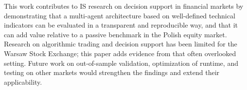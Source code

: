 \documentclass{icis}
\begin{document}
This work contributes to IS research on decision support in financial markets by demonstrating that a multi-agent architecture based on well-defined technical indicators can be evaluated in a transparent and reproducible way, and that it can add value relative to a passive benchmark in the Polish equity market. Research on algorithmic trading and decision support has been limited for the Warsaw Stock Exchange; this paper adds evidence from that often overlooked setting. Future work on out-of-sample validation, optimization of runtime, and testing on other markets would strengthen the findings and extend their applicability.

\printbibliography
\end{document}
